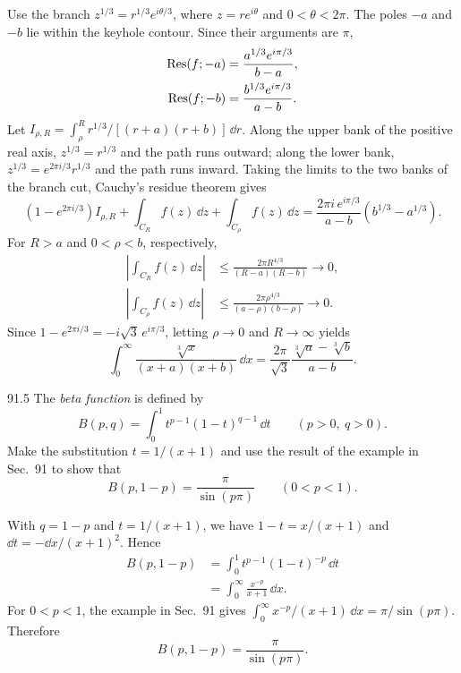 \documentclass[11pt,oneside]{article}
\begin{document}
\begin{solution}
Use the branch $z^{1/3}=r^{1/3}e^{i\theta/3}$, where $z=re^{i\theta}$ and $0<\theta<2\pi$. The poles $-a$ and $-b$ lie within the keyhole contour. Since their arguments are $\pi$,
\[
\begin{aligned}
    \operatorname{Res}(f;-a)&=\frac{a^{1/3}e^{i\pi/3}}{b-a},\\
    \operatorname{Res}(f;-b)&=\frac{b^{1/3}e^{i\pi/3}}{a-b}.
\end{aligned}
\]
Let $I_{\rho,R}=\int_\rho^R r^{1/3}/[(r+a)(r+b)]\,\dd r$. Along the upper bank of the positive real axis, $z^{1/3}=r^{1/3}$ and the path runs outward; along the lower bank, $z^{1/3}=e^{2\pi i/3}r^{1/3}$ and the path runs inward. Taking the limits to the two banks of the branch cut, Cauchy's residue theorem gives
\[
    (1-e^{2\pi i/3})I_{\rho,R}
      +\int_{C_R}f(z)\,\dd z+\int_{C_\rho}f(z)\,\dd z
      =\frac{2\pi i\,e^{i\pi/3}}{a-b}(b^{1/3}-a^{1/3}).
\]
For $R>a$ and $0<\rho<b$, respectively,
\[
\begin{aligned}
    \left|\int_{C_R}f(z)\,\dd z\right|
        &\le\frac{2\pi R^{4/3}}{(R-a)(R-b)}\longrightarrow0,\\
    \left|\int_{C_\rho}f(z)\,\dd z\right|
        &\le\frac{2\pi\rho^{4/3}}{(a-\rho)(b-\rho)}\longrightarrow0.
\end{aligned}
\]
Since $1-e^{2\pi i/3}=-i\sqrt3\,e^{i\pi/3}$, letting $\rho\to0$ and $R\to\infty$ yields
\[
    \boxed{\int_0^\infty\frac{\sqrt[3]{x}}{(x+a)(x+b)}\,\dd x
       =\frac{2\pi}{\sqrt3}\frac{\sqrt[3]{a}-\sqrt[3]{b}}{a-b}.}
\]
\end{solution}

\begin{exercise}{91.5}
The \emph{beta function} is defined by
\[
    B(p,q)=\int_0^1t^{p-1}(1-t)^{q-1}\,\dd t\qquad(p>0,\ q>0).
\]
Make the substitution $t=1/(x+1)$ and use the result of the example in Sec.~91 to show that
\[
    B(p,1-p)=\frac\pi{\sin(p\pi)}\qquad(0<p<1).
\]
\end{exercise}

\begin{solution}
With $q=1-p$ and $t=1/(x+1)$, we have $1-t=x/(x+1)$ and $\dd t=-\dd x/(x+1)^2$. Hence
\[
\begin{aligned}
    B(p,1-p)
    &=\int_0^1t^{p-1}(1-t)^{-p}\,\dd t\\
    &=\int_0^\infty\frac{x^{-p}}{x+1}\,\dd x.
\end{aligned}
\]
For $0<p<1$, the example in Sec.~91 gives $\int_0^\infty x^{-p}/(x+1)\,\dd x=\pi/\sin(p\pi)$. Therefore
\[
    \boxed{B(p,1-p)=\frac\pi{\sin(p\pi)}.}
\]
\end{solution}
\end{document}
